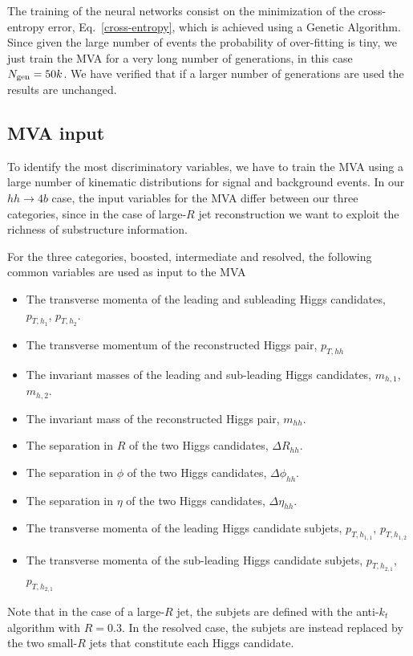  The training of the neural networks consist on the
 minimization of the cross-entropy error,
 Eq.~\ref{cross-entropy}, which is achieved using a
 Genetic Algorithm.
 Since given the large number of events the probability of
 over-fitting is tiny, we just train the MVA for a very long
 number of generations, in this case $N_{\rm gen}=50k$.
 We have verified that if a larger number of generations
 are used the results are unchanged.

 

 \subsection{MVA input}

 To identify the most discriminatory variables, we have to train
 the MVA using a large number of kinematic distributions for
 signal and background events.
%
In our $hh\to 4b$ case,
the input variables for the MVA differ between our three categories,
since in the case of large-$R$ jet reconstruction we want to exploit
the richness of substructure information.

For the three categories, boosted, intermediate and resolved,
the following common variables are used as input to the MVA
\begin{itemize}
\item The transverse momenta of the leading and subleading Higgs candidates, $p_{T,h_1}$, $p_{T,h_2}$.
\item The transverse momentum of the reconstructed Higgs pair, $p_{T,hh}$
\item The invariant masses of the leading and sub-leading Higgs candidates, $m_{h,1}$, $m_{h,2}$.
\item The invariant mass of the reconstructed Higgs pair, $m_{hh}$.
\item The separation in $R$ of the two Higgs candidates, $\Delta R_{hh}$.
\item The separation in $\phi$ of the two Higgs candidates, $\Delta \phi_{hh}$.
\item The separation in $\eta$ of the two Higgs candidates, $\Delta \eta_{hh}$.
\item The transverse momenta of the leading Higgs candidate subjets, $p_{T,h_{1,1}}$, $p_{T,h_{1,2}}$
\item The transverse momenta of the sub-leading Higgs candidate subjets, $p_{T,h_{2,1}}$, $p_{T,h_{2,1}}$
\end{itemize}
Note that in the case of a large-$R$ jet, the subjets are defined
with the anti-$k_t$ algorithm with $R=0.3$.
%
In the resolved case, the subjets are instead replaced by the two
small-$R$ jets that constitute each Higgs candidate.

